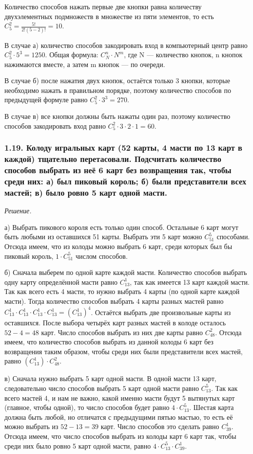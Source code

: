 \documentclass{book}
\begin{document}
Количество способов нажать первые две кнопки равна количеству двухэлементных подмножеств в множестве из пяти элементов, то есть $C_5^2=\frac{5!}{2!\left(5-2\right)!}=10$.

В случае а) количество способов закодировать вход в компьютерный центр равно $C_5^2\cdot 5^3=1250$. Общая формула: $C_N^n\cdot N^m$, где N --- количество кнопок, n кнопок нажимаются вместе, а затем m кнопок --- по очереди.

В случае б) после нажатия двух кнопок, остаётся только 3 кнопки, которые необходимо нажать в правильном порядке, поэтому количество способов по предыдущей формуле равно $C_5^2\cdot 3^3=270$.

В случае в) все кнопки должны быть нажаты один раз, поэтому количество способов закодировать вход равно $C_5^2\cdot 3\cdot 2\cdot 1=60$.

\subsubsection*{1.19. Колоду игральных карт (52 карты, 4 масти по 13 карт в каждой) тщательно перетасовали. Подсчитать количество способов выбрать из неё 6 карт без возвращения так, чтобы среди них: а) был пиковый король; б) были представители всех мастей; в) было ровно 5 карт одной масти.}

\textit{Решение.}

а) Выбрать пикового короля есть только один способ. Остальные 6 карт могут быть любыми из оставшихся 51 карты. Выбрать эти 5 карт можно $C_51^5$ способами. Отсюда имеем, что из колоды можно выбрать 6 карт, среди которых был бы пиковый король, $1\cdot C_51^5$ числом способов.

б) Сначала выберем по одной карте каждой масти. Количество способов выбрать одну карту определённой масти равно $C_13^1$, так как имеется 13 карт каждой масти. Так как всего есть 4 масти, то нужно выбрать 4 карты (по одной карте каждой масти). Тогда количество способов выбрать 4 карты разных мастей равно $C_13^1\cdot C_13^1\cdot C_13^1\cdot C_13^1=\left(C_13^1\right)^4$. Остаётся выбрать две произвольные карты из оставшихся. После выбора четырёх карт разных мастей в колоде осталось $52-4=48$ карт. Число способов выбрать из них две карты равно $C_48^2$. Отсюда имеем, что количество способов выбрать из данной колоды 6 карт без возвращения таким образом, чтобы среди них были представители всех мастей, равно $\left(C_13^1\right)\cdot C_48^2$.

в) Сначала нужно выбрать 5 карт одной масти. В одной масти 13 карт, следовательно число способов выбрать 5 карт одной масти равно $C_13^5$. Так как всего мастей 4, и нам не важно, какой именно масти будут 5 вытянутых карт (главное, чтобы одной), то число способов будет равно $4\cdot C_13^5$. Шестая карта должна быть любой, но отличатся с предыдущими пятью мастью, то есть её можно выбрать из $52-13=39$ карт. Число способов это сделать равно $C_39^1$. Отсюда имеем, что число способов выбрать из колоды карт 6 карт так, чтобы среди них было ровно 5 карт одной масти, равно $4\cdot C_13^5\cdot C_39^1$.
\end{document}
